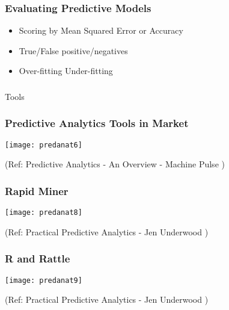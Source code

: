 \begin{frame}\frametitle{Evaluating Predictive Models}

\begin{itemize}
\item Scoring by Mean Squared Error or Accuracy
\item True/False positive/negatives
\item Over-fitting Under-fitting
\end{itemize}

\end{frame}

\begin{frame}[fragile]\frametitle{}
\begin{center}
{\Large Tools}
\end{center}
\end{frame}


\begin{frame}\frametitle{Predictive Analytics Tools in Market}

\begin{center}
\texttt{[image: predanat6]}
\end{center}

{\tiny (Ref: Predictive Analytics - An Overview - Machine Pulse )}


\end{frame}

\begin{frame}\frametitle{Rapid Miner}

\begin{center}
\texttt{[image: predanat8]}
\end{center}

{\tiny (Ref: Practical Predictive Analytics - Jen Underwood )}


\end{frame}

\begin{frame}\frametitle{R and Rattle}

\begin{center}
\texttt{[image: predanat9]}
\end{center}

{\tiny (Ref: Practical Predictive Analytics - Jen Underwood )}


\end{frame}

